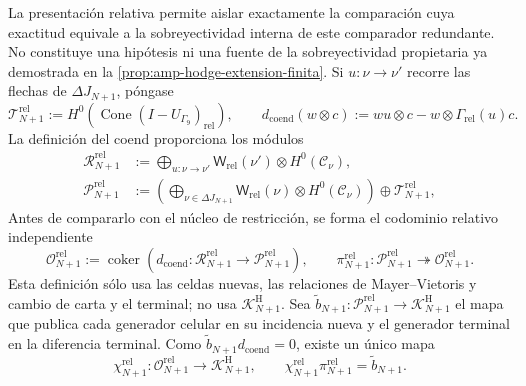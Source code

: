 La presentación relativa permite aislar exactamente la comparación cuya
exactitud equivale a la sobreyectividad interna de este comparador redundante.
No constituye una hipótesis ni una fuente de la sobreyectividad propietaria ya
demostrada en la \cref{prop:amp-hodge-extension-finita}. Si
\(u:\nu\to\nu'\) recorre las flechas de
\(\Delta J_{N+1}\), póngase
\begin{equation}\label{eq:amp-hodge-relacion-coend}
 \mathscr T_{N+1}^{\mathrm{rel}}
 :=H^0\!\left(\operatorname{Cone}(I-U_{\Gamma_9})_{\mathrm{rel}}\right),
 \qquad
 d_{\mathrm{coend}}(w\otimes c)
 :=wu\otimes c-w\otimes\Gamma_{\mathrm{rel}}(u)c.
\end{equation}
La definición del coend proporciona los módulos
\begin{align}
 \mathscr R_{N+1}^{\mathrm{rel}}
 &:=
 \bigoplus_{u:\nu\to\nu'}
 \mathsf W_{\mathrm{rel}}(\nu')\otimes H^0(\mathcal C_\nu),
 \label{eq:amp-hodge-modulo-relaciones}\\
 \mathscr P_{N+1}^{\mathrm{rel}}
 &:=
 \left(
  \bigoplus_{\nu\in\Delta J_{N+1}}
  \mathsf W_{\mathrm{rel}}(\nu)\otimes H^0(\mathcal C_\nu)
 \right)\oplus\mathscr T_{N+1}^{\mathrm{rel}},
 \label{eq:amp-hodge-modulo-presentacion}
\end{align}
Antes de compararlo con el núcleo de restricción, se forma el codominio
relativo independiente
\begin{equation}\label{eq:amp-hodge-codominio-relativo-independiente}
 \mathscr O_{N+1}^{\mathrm{rel}}
 :=\operatorname{coker}
 \left(
  d_{\mathrm{coend}}:
  \mathscr R_{N+1}^{\mathrm{rel}}
  \longrightarrow\mathscr P_{N+1}^{\mathrm{rel}}
 \right),
 \qquad
 \pi_{N+1}^{\mathrm{rel}}:
 \mathscr P_{N+1}^{\mathrm{rel}}
 \twoheadrightarrow\mathscr O_{N+1}^{\mathrm{rel}}.
\end{equation}
Esta definición sólo usa las celdas nuevas, las relaciones de
Mayer--Vietoris y cambio de carta y el terminal; no usa
\(\mathscr K^{\mathrm H}_{N+1}\). Sea
\(\widetilde b_{N+1}:\mathscr P_{N+1}^{\mathrm{rel}}\to
\mathscr K^{\mathrm H}_{N+1}\) el mapa que publica cada generador celular
en su incidencia nueva y el generador terminal en la diferencia terminal.
Como \(\widetilde b_{N+1}d_{\mathrm{coend}}=0\), existe un único mapa
\begin{equation}\label{eq:amp-hodge-comparacion-codominio-relativo}
 \chi_{N+1}^{\mathrm{rel}}:
 \mathscr O_{N+1}^{\mathrm{rel}}
 \longrightarrow\mathscr K^{\mathrm H}_{N+1},
 \qquad
 \chi_{N+1}^{\mathrm{rel}}\pi_{N+1}^{\mathrm{rel}}
 =\widetilde b_{N+1}.
\end{equation}


